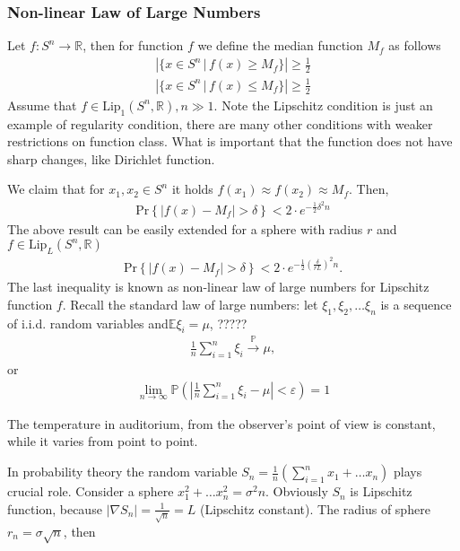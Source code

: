 \subsubsection{Non-linear Law of Large Numbers}
Let $f : S^n \to \mathbb{R}$, then for function $f$ we define the median function $M_f$ as follows 
\begin{eqnarray}
\left| \{x \in S^n \, | \, f(x) \ge M_f \}\right| \ge \frac 1 2 \\
\left| \{x \in S^n \, | \, f(x) \le M_f \}\right| \ge \frac 1 2 
\end{eqnarray}
Assume that $f \in \text{Lip}_1(S^n, \mathbb{R}), n \gg 1$. Note the Lipschitz condition is just an example of regularity condition, there are many other conditions with weaker restrictions on function class. What is important that the function does not have sharp changes, like Dirichlet function. \par We claim that for $x_1, x_2 \in S^n$ it holds $f(x_1) \approx f(x_2) \approx M_f$. Then, 
\begin{eqnarray}
\text{Pr}\left\{|f(x) - M_f| > \delta \right\} < 2 \cdot e^{-\frac 1 2 \delta^2 n}
\end{eqnarray}
The above result can be easily extended for a sphere with radius $r$ and $f \in \text{Lip}_L(S^n, \mathbb{R})$
\begin{eqnarray}
\text{Pr}\left\{|f(x) - M_f| > \delta \right\} < 2 \cdot e^{-\frac 1 2 \left(\frac{\delta}{rL}\right)^2 n}.
\end{eqnarray}
The last inequality is known as non-linear law of large numbers for Lipschitz function $f$. Recall the standard law of large numbers: let $\xi_1, \xi_2, \dots \xi_n$ is a sequence of i.i.d. random variables and$\mathbb{E}\xi_i = \mu$, ????? 
\begin{eqnarray}
\frac 1 n \sum_{i=1}^n {\xi_i}  \xrightarrow{\mathbb{P}} \mu,
\end{eqnarray}
or
\begin{eqnarray}
\lim_{n\to \infty} \mathbb{P}\left(\left|\frac 1 n \sum_{i=1}^n {\xi_i} - \mu \right| < \varepsilon\right) = 1
\end{eqnarray}
\begin{ex}
The temperature in auditorium, from the observer's point of view is constant, while it varies from point to point. 
\end{ex}
\par In probability theory the random variable $S_n = \frac 1 n \left(\sum_{i=1}^n x_1 + \dots x_n \right)$ plays crucial role. Consider a sphere $x_1^2 + \dots x_n^2 = \sigma^2 n$. Obviously $S_n$ is Lipschitz function, because $|\nabla S_n| = \frac 1 {\sqrt{n}} = L$ (Lipschitz constant). The radius of sphere  $r_n = \sigma \sqrt{n}$, then
